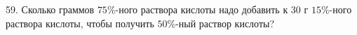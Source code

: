 59. Сколько граммов $75\%$-ного раствора кислоты надо добавить к 30 г $15\%$-ного раствора кислоты, чтобы получить $50\%$-ный раствор кислоты?\\
